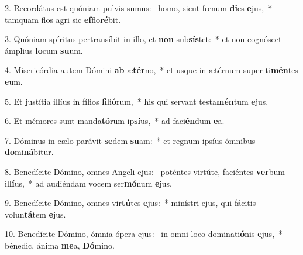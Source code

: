 2. Recordátus est quóniam pulvis sumus: \dag\  homo, sicut fœnum \textbf{di}es \textbf{e}jus,~*  tamquam flos agri sic \textbf{ef}flo\textbf{ré}bit.\

3. Quóniam spíritus pertransíbit in illo, et \textbf{non} sub\textbf{sís}tet:~*  et non cognóscet ámplius \textbf{lo}cum \textbf{su}um.\

4. Misericórdia autem Dómini \textbf{ab} æ\textbf{tér}no,~*  et usque in ætérnum super ti\textbf{mén}tes \textbf{e}um.\

5. Et justítia illíus in fílios \textbf{fi}li\textbf{ó}rum,~*  his qui servant testa\textbf{mén}tum \textbf{e}jus.\

6. Et mémores sunt manda\textbf{tó}rum ip\textbf{sí}us,~*  ad faci\textbf{én}dum \textbf{e}a.\

7. Dóminus in cælo parávit \textbf{se}dem \textbf{su}am:~*  et regnum ipsíus ómnibus \textbf{do}mi\textbf{ná}bitur.\

8. Benedícite Dómino, omnes Angeli ejus: \dag\  poténtes virtúte, faciéntes \textbf{ver}bum il\textbf{lí}us,~*  ad audiéndam vocem ser\textbf{mó}num \textbf{e}jus.\

9. Benedícite Dómino, omnes vir\textbf{tú}tes \textbf{e}jus:~*  minístri ejus, qui fácitis volun\textbf{tá}tem \textbf{e}jus.\

10. Benedícite Dómino, ómnia ópera ejus: \dag\  in omni loco dominati\textbf{ó}nis \textbf{e}jus,~*  bénedic, ánima \textbf{me}a, \textbf{Dó}mino.\

